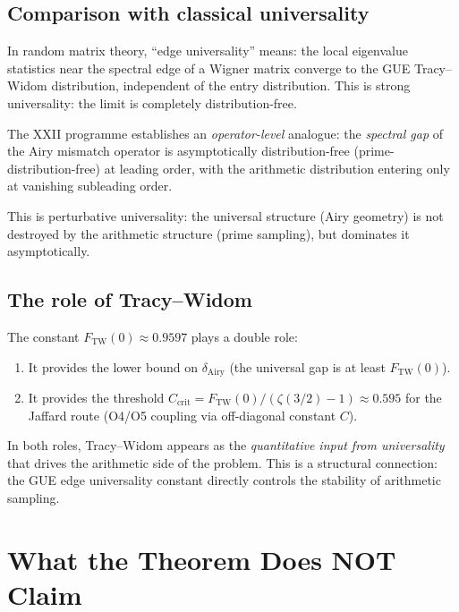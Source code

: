 \documentclass[12pt,a4paper]{amsart}
\theoremstyle{definition}
\begin{document}
\subsection{Comparison with classical universality}

In random matrix theory, ``edge universality'' means:
the local eigenvalue statistics near the spectral edge of a Wigner matrix
converge to the GUE Tracy--Widom distribution, independent of the
entry distribution.
This is strong universality: the limit is completely distribution-free.

The XXII programme establishes an \emph{operator-level} analogue:
the \emph{spectral gap} of the Airy mismatch operator is
asymptotically distribution-free (prime-distribution-free)
at leading order, with the arithmetic distribution entering
only at vanishing subleading order.

This is perturbative universality: the universal structure
(Airy geometry) is not destroyed by the arithmetic structure
(prime sampling), but dominates it asymptotically.

\subsection{The role of Tracy--Widom}

The constant $F_{\mathrm{TW}}(0) \approx 0.9597$ plays a double role:
\begin{enumerate}
  \item It provides the lower bound on $\delta_{\mathrm{Airy}}$
    (the universal gap is at least $F_{\mathrm{TW}}(0)$).
  \item It provides the threshold $C_{\mathrm{crit}} = F_{\mathrm{TW}}(0)/(\zeta(3/2)-1) \approx 0.595$
    for the Jaffard route (O4/O5 coupling via off-diagonal constant $C$).
\end{enumerate}
In both roles, Tracy--Widom appears as the \emph{quantitative input from universality}
that drives the arithmetic side of the problem.
This is a structural connection: the GUE edge universality constant
directly controls the stability of arithmetic sampling.

\section{What the Theorem Does NOT Claim}
\label{sec:notclaim}
\end{document}
